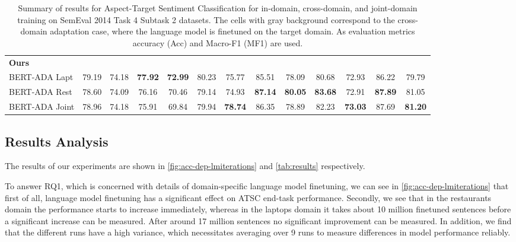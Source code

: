 \documentclass[11pt,a4paper]{article}
\newcommand{\lgray}{\cellcolor{lightgray!25}}
\newcommand{\rood}[1]{}
\begin{document}
\begin{table*}[h!]
\begin{center}
{\begin{tabular}{lcccccc|cccccc}
\textbf{Ours}   \\  

BERT-ADA Lapt & 79.19 & 74.18 & \lgray \textbf{77.92}  & \lgray \textbf{72.99} & 80.23 & 75.77 &
85.51 & 78.09 & 80.68  & 72.93  & 86.22 & 79.79  \\

BERT-ADA Rest & 78.60  &  74.09 & 76.16  & 70.46  & 79.14 & 74.93 &
\textbf{87.14}  & \textbf{80.05} & \lgray \textbf{83.68}  & \lgray 72.91 & \textbf{87.89} & 81.05 \\

BERT-ADA Joint & 78.96  & 74.18  & 75.91 & 69.84  & 79.94 & \textbf{78.74} &
86.35  & 78.89  & 82.23 & \textbf{73.03}  & 87.69  & \textbf{81.20} \\
\bottomrule
\end{tabular}
}
\end{center}
\caption{Summary of results for Aspect-Target Sentiment Classification for in-domain, cross-domain, and joint-domain training on SemEval 2014 Task 4 Subtask 2 datasets. 
The cells with gray background correspond to the cross-domain adaptation case, where 
the language model is finetuned on the target domain.
As evaluation metrics accuracy (Acc) and Macro-F1 (MF1) are used. }\label{tab:results}
\end{table*}

\subsection{Results Analysis}
\rood{Outcome: Readers should get a feel for why the results are how they are. 
  First describe the bigger picture in the sense like method x/y performs best.
  We think that method x/y perform best because of w/z \\
  First split results into Categories and then 
  think about all the relevant statements you want to make
}
The results of our experiments are shown in \autoref{fig:acc-dep-lmiterations} 
and \autoref{tab:results} respectively.

To answer RQ1, which is concerned with details of domain-specific language model finetuning, we can see in \autoref{fig:acc-dep-lmiterations} that first of all, language model finetuning has a significant effect on ATSC end-task performance. 
Secondly, we see that in the restaurants domain the performance starts to increase immediately, whereas in the laptops domain it takes about 10 million finetuned sentences before a significant increase can be measured.
After around 17 million sentences no significant improvement can be measured.
In addition, we find that the different runs have a high variance, which necessitates averaging over 9 runs to measure differences in model performance reliably.
\end{document}

